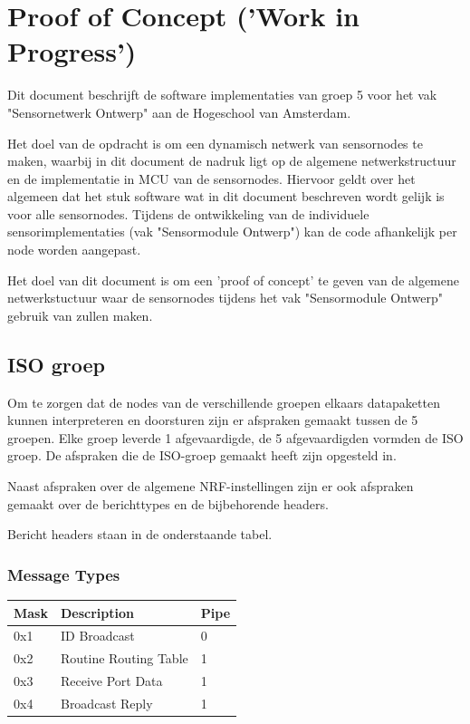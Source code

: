 
\section{Proof of Concept ('Work in Progress')}
Dit document beschrijft de software implementaties van groep 5 voor het vak "Sensornetwerk Ontwerp" aan de Hogeschool van Amsterdam.

Het doel van de opdracht is om een dynamisch netwerk van sensornodes te maken, waarbij in dit document de nadruk ligt op de algemene netwerkstructuur en de implementatie in MCU van de sensornodes. Hiervoor geldt over het algemeen dat het stuk software wat in dit document beschreven wordt gelijk is voor alle sensornodes. Tijdens de ontwikkeling van de individuele sensorimplementaties (vak "Sensormodule Ontwerp") kan de code afhankelijk per node worden aangepast. 

Het doel van dit document is om een 'proof of concept' te geven van de algemene netwerkstuctuur waar de sensornodes tijdens het vak "Sensormodule Ontwerp" gebruik van zullen maken.


\subsection{ISO groep}
Om te zorgen dat de nodes van de verschillende groepen elkaars datapaketten kunnen interpreteren en doorsturen zijn er afspraken gemaakt tussen de 5 groepen. Elke groep leverde 1 afgevaardigde, de 5 afgevaardigden vormden de ISO groep. De afspraken die de ISO-groep gemaakt heeft zijn opgesteld in\cite{ISO}. 

Naast afspraken over de algemene NRF-instellingen zijn er ook afspraken gemaakt over de berichttypes en de bijbehorende headers.

Bericht headers staan in de onderstaande tabel.
\subsubsection*{Message Types}
\begin{table}[h]
\begin{tabular}{|l|l|l|}
\hline
\rowcolor[HTML]{EFEFEF} 
Mask & Description           & Pipe \\ \hline
0x1  & ID Broadcast          & 0    \\ \hline
0x2  & Routine Routing Table & 1    \\ \hline
0x3  & Receive Port Data     & 1    \\ \hline
0x4  & Broadcast Reply       & 1    \\ \hline
\end{tabular}
\end{table}

